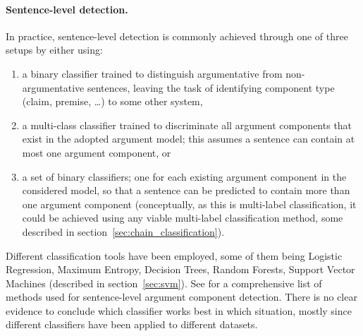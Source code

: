 \paragraph{Sentence-level detection.} 
In practice, sentence-level detection is commonly achieved through one of three
setups by either using:
\begin{enumerate}
\item a binary classifier trained to distinguish argumentative from 
	non-argumentative sentences, leaving the task of identifying component type
	(claim, premise, \dots) to some other system, 
\item a multi-class classifier trained to discriminate all argument components that
	exist in the adopted argument model; this assumes a sentence can contain at most
	one argument component, or 
\item a set of binary classifiers; one for each existing argument component in
	the considered model, so that a sentence can be predicted to contain
		more than one argument component (conceptually, as this is
		multi-label classification, it could be achieved using any
		viable multi-label classification method, some described in 
		section~\ref{sec:chain_classification}).
\end{enumerate}
Different classification tools have been employed,  
some of them being Logistic Regression, Maximum Entropy, Decision
Trees, Random Forests, Support Vector Machines (described in section~\ref{sec:svm}).
See \citep{lippi2016argumentation} for a comprehensive list of methods used for 
sentence-level argument component detection.
There is no clear evidence to conclude which classifier works best 
in which situation, mostly since different classifiers have been applied
to different datasets. 

